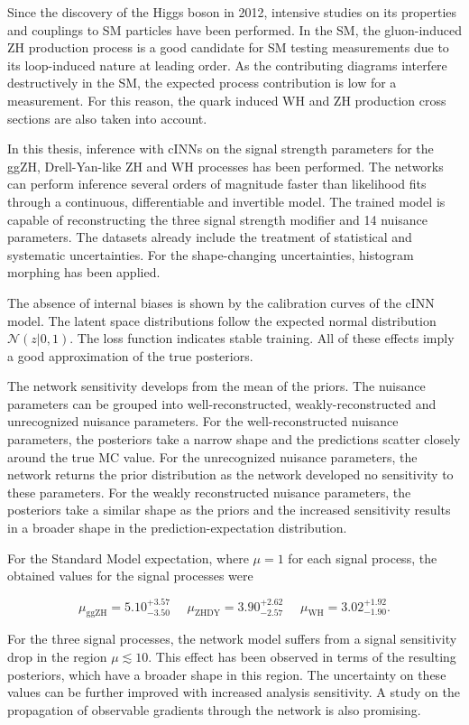 \label{sec:conclusion}

Since the discovery of the Higgs boson in 2012, intensive studies on its properties and couplings to SM particles have been performed. In the SM, the gluon-induced ZH production process is a good candidate for SM testing measurements due to its loop-induced nature at leading order. As the contributing diagrams interfere destructively in the SM, the expected process contribution is low for a measurement. For this reason, the quark induced WH and ZH production cross sections are also taken into account.

In this thesis, inference with cINNs on the signal strength parameters for the ggZH, Drell-Yan-like ZH and WH processes has been performed. The networks can perform inference several orders of magnitude faster than likelihood fits through a continuous, differentiable and invertible model. The trained model is capable of reconstructing the three signal strength modifier and 14 nuisance parameters. The datasets already include the treatment of statistical and systematic uncertainties. For the shape-changing uncertainties, histogram morphing has been applied.

The absence of internal biases is shown by the calibration curves of the cINN model. The latent space distributions follow the expected normal distribution $\mathcal{N}(z | 0,1)$. The loss function indicates stable training. All of these effects imply a good approximation of the true posteriors.

The network sensitivity develops from the mean of the priors. The nuisance parameters can be grouped into well-reconstructed, weakly-reconstructed and unrecognized nuisance parameters. For the well-reconstructed nuisance parameters, the posteriors take a narrow shape and the predictions scatter closely around the true MC value. For the unrecognized nuisance parameters, the network returns the prior distribution as the network developed no sensitivity to these parameters. For the weakly reconstructed nuisance parameters, the posteriors take a similar shape as the priors and the increased sensitivity results in a broader shape in the prediction-expectation distribution.

For the Standard Model expectation, where $\mu=1$ for each signal process, the obtained values for the signal processes were

\begin{equation*}
	\mu_\text{ggZH} = 5.10^{+3.57}_{-3.50} \, \, \quad \mu_\text{ZHDY} = 3.90^{+2.62}_{-2.57} \, \, \quad \mu_\text{WH} = 3.02^{+1.92}_{-1.90}.
\end{equation*}

For the three signal processes, the network model suffers from a signal sensitivity drop in the region $\mu\lesssim10$. This effect has been observed in terms of the resulting posteriors, which have a broader shape in this region. The uncertainty on these values can be further improved with increased analysis sensitivity. A study on the propagation of observable gradients through the network is also promising.
